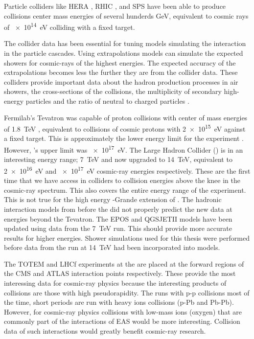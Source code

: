 Particle colliders like HERA \cite{abramowicz1999hera}, RHIC \cite{harrison2003rhic}, and SPS \cite{bozzo1984sps} have been able to produce collisions center mass energies of several hunderds \si{\GeV}, equivalent to cosmic rays of \SI{e14}{\eV} colliding with a fixed target.

The collider data has been essential for tuning models simulating the interaction in the particle cascades. Using extrapolations models can simulate the expected showers for cosmic-rays of the highest energies. The expected accuracy of the extrapolations becomes less the further they are from the collider data. These colliders provide important data about the hadron production processes in air showers, the cross-sections of the collisions, the multiplicity of secondary high-energy particles and the ratio of neutral to charged particles \cite{pierog2008lhc}.

Fermilab's Tevatron was capable of proton collisions with center of mass energies of \SI{1.8}{\TeV} \cite{abe1994tevatron}, equivalent to collisions of cosmic protons with \SI{2e15}{\eV} against a fixed target. This is approximately the lower energy limit for the \kascade experiment \cite{antoni2003kascade}. However, \kascade's upper limit was \SI{e17}{\eV}. The Large Hadron Collider (\lhc) is in an interesting energy range; \SI{7}{\TeV} and now upgraded to \SI{14}{\TeV}, equivalent to \SI{2e16}{\eV} and \SI{e17}{\eV} cosmic-ray energies respectively. These are the first time that we have access in colliders to collision energies above the knee in the cosmic-ray spectrum. This also covers the entire energy range of the \kascade experiment. This is not true for the high energy \kascade-Grande extension of \kascade \cite{apel2010kascadegrande}. The hadronic interaction models from before the \lhc did not properly predict the new \lhc data at energies beyond the Tevatron. The EPOS \cite{pierog2015epos} and QGSJETII \cite{ostapchenko2013qgsjetii} models have been updated using \lhc data from the \SI{7}{\TeV} run. This should provide more accurate results for higher energies. Shower simulations used for this thesis were performed before data from the \lhc run at \SI{14}{\TeV} had been incorporated into models.

The TOTEM \cite{antchev2010totem,antchev2011totem} and LHCf \cite{adriani2008lhcf} experiments at the \lhc are placed at the forward regions of the CMS and ATLAS interaction points respectively. These provide the most interessing data for cosmic-ray physics because the interesting products of collisions are those with high pseudorapidity. The \lhc runs with p-p collisions most of the time, short periods are run with heavy ions collisions (p-Pb and Pb-Pb). However, for cosmic-ray physics collisions with low-mass ions (oxygen) that are commonly part of the interactions of EAS would be more interesting. Collision data of such interactions would greatly benefit cosmic-ray research.

